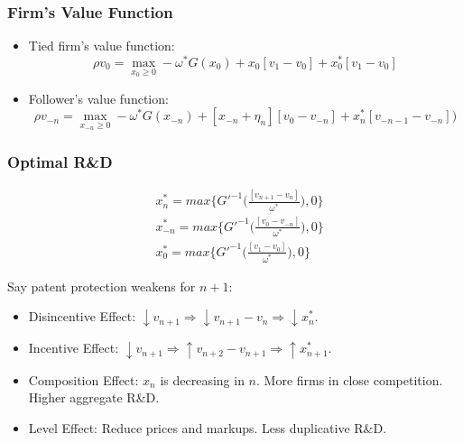\documentclass{beamer}
\begin{document}
\begin{frame}[t]\frametitle{Firm's Value Function} 
  \begin{itemize}
    \item<+-> Tied firm's value function:
      \begin{equation*} \label{eq:rvf_tied}
        \rho v_0 = \max_{x_0 \geq 0} -\omega^*G(x_{0}) + x_{0}[v_1 - v_0] + x_0^*[v_{1} - v_0]
      \end{equation*}

    \item<+-> Follower's value function:
      \begin{equation*} \label{eq:rvf_follower}
        \rho v_{-n} = \max_{x_{-n} \geq 0} -\omega^*G(x_{-n}) + [x_{-n} + \eta_n][v_0 - v_{-n}] + x_n^*[v_{-n-1} - v_{-n}])
      \end{equation*}
  \end{itemize}
\end{frame}

\begin{frame}[t]\frametitle{Optimal R\&D}
  \!\!\!\!\!\!\!\!\!\!\!\! %
  \begin{align} \label{eq:ss_rd_policies}
    &x_n^*    = max \big\{G'^{-1}\Bigg(\frac{[v_{n+1} - v_n]}{\omega^*}\Bigg)   ,0\}\\
    &x_{-n}^* = max \big\{G'^{-1}\Bigg(\frac{[v_0  - v_{-n}]}{\omega^*}\Bigg)   ,0\}\\
    &x_0^*    = max \big\{G'^{-1}\Bigg(\frac{[v_1     - v_0]}{\omega^*}\Bigg)   ,0\}
  \end{align}

  Say patent protection weakens for $n + 1$:
  \begin{itemize}
    \item<2-> Disincentive Effect: $\downarrow v_{n+1} \Rightarrow \downarrow v_{n+1} - v_n \Rightarrow \downarrow x_n^*$.
    \item<3-> Incentive Effect: $\downarrow v_{n+1} \Rightarrow \uparrow v_{n+2} - v_{n+1} \Rightarrow \uparrow x_{n+1}^*$.
    \item<4-> Composition Effect: $x_n$ is decreasing in $n$. More firms in close competition. Higher aggregate R\&D.
    \item<5-> Level Effect: Reduce prices and markups.  Less duplicative R\&D.
  \end{itemize}
\end{frame}
\end{document}
